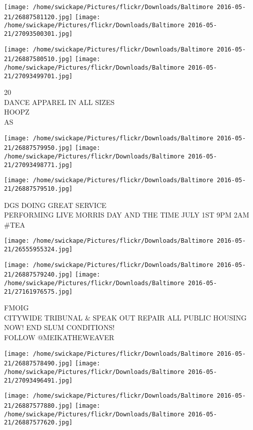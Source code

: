 \documentclass[10pt,letterpaper]{article}
\begin{document}
\texttt{[image: /home/swickape/Pictures/flickr/Downloads/Baltimore 2016-05-21/26887581120.jpg]}
\texttt{[image: /home/swickape/Pictures/flickr/Downloads/Baltimore 2016-05-21/27093500301.jpg]}

\texttt{[image: /home/swickape/Pictures/flickr/Downloads/Baltimore 2016-05-21/26887580510.jpg]}
\texttt{[image: /home/swickape/Pictures/flickr/Downloads/Baltimore 2016-05-21/27093499701.jpg]}

20\\
DANCE APPAREL IN ALL SIZES\\
HOOPZ\\
AS\\
\pagebreak

\texttt{[image: /home/swickape/Pictures/flickr/Downloads/Baltimore 2016-05-21/26887579950.jpg]}
\texttt{[image: /home/swickape/Pictures/flickr/Downloads/Baltimore 2016-05-21/27093498771.jpg]}

\vspace{0.25in}
\texttt{[image: /home/swickape/Pictures/flickr/Downloads/Baltimore 2016-05-21/26887579510.jpg]}

DGS DOING GREAT SERVICE\\
PERFORMING LIVE MORRIS DAY AND THE TIME JULY 1ST 9PM 2AM\\
\#TEA\\
\pagebreak

\texttt{[image: /home/swickape/Pictures/flickr/Downloads/Baltimore 2016-05-21/26555955324.jpg]}

\vspace{0.25in}
\texttt{[image: /home/swickape/Pictures/flickr/Downloads/Baltimore 2016-05-21/26887579240.jpg]}
\texttt{[image: /home/swickape/Pictures/flickr/Downloads/Baltimore 2016-05-21/27161976575.jpg]}

FMOIG\\
CITYWIDE TRIBUNAL \& SPEAK OUT REPAIR ALL PUBLIC HOUSING NOW!  END SLUM CONDITIONS!\\
FOLLOW @MEIKATHEWEAVER\\
\pagebreak

\texttt{[image: /home/swickape/Pictures/flickr/Downloads/Baltimore 2016-05-21/26887578490.jpg]}
\texttt{[image: /home/swickape/Pictures/flickr/Downloads/Baltimore 2016-05-21/27093496491.jpg]}

\texttt{[image: /home/swickape/Pictures/flickr/Downloads/Baltimore 2016-05-21/26887577880.jpg]}
\texttt{[image: /home/swickape/Pictures/flickr/Downloads/Baltimore 2016-05-21/26887577620.jpg]}
\end{document}
